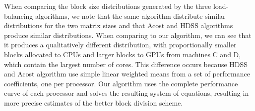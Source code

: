 \documentclass[journal]{IEEEtran}
\begin{document}
When comparing the block size distributions generated by the three
load-balancing algorithms, we note that the same algorithm distribute similar
distributions for the two matrix sizes and that Acost and HDSS algorithms
produce similar distributions. When comparing to our algorithm, we can see that
it produces a qualitatively different distribution, with proportionally smaller
blocks allocated to CPUs and larger blocks to GPUs from machines C and D, which
contain the largest number of cores. This difference occurs because HDSS and
Acost algorithm use simple linear weighted means from a set of performance
coefficients, one per processor. Our algorithm uses the complete performance
curve of each processor and solves the resulting system of equations, resulting
in more precise estimates of the better block division scheme.


\end{document}
